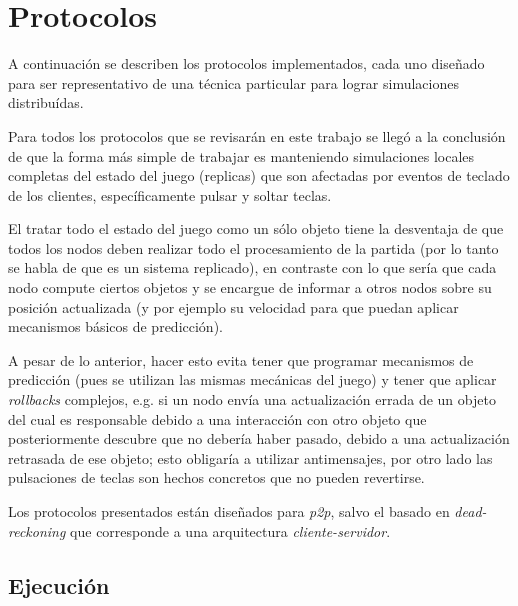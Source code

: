 \section{Protocolos}



A continuación se describen los protocolos implementados, cada uno diseñado para ser representativo de una técnica particular para lograr simulaciones distribuídas.

Para todos los protocolos que se revisarán en este trabajo se llegó a la conclusión de que la forma más simple de trabajar es manteniendo simulaciones locales completas del estado del juego (replicas) que son afectadas por eventos de teclado de los clientes, específicamente pulsar y soltar teclas.

El tratar todo el estado del juego como un sólo objeto tiene la desventaja de que todos los nodos deben realizar todo el procesamiento de la partida (por lo tanto se habla de que es un sistema replicado), en contraste con lo que sería que cada nodo compute ciertos objetos y se encargue de informar a otros nodos sobre su posición actualizada (y por ejemplo su velocidad para que puedan aplicar mecanismos básicos de predicción).


A pesar de lo anterior, hacer esto evita tener que programar mecanismos de predicción (pues se utilizan las mismas mecánicas del juego) y tener que aplicar \emph{rollbacks} complejos, e.g. si un nodo envía una actualización errada de un objeto del cual es responsable debido a una interacción con otro objeto que posteriormente descubre que no debería haber pasado, debido a una actualización retrasada de ese objeto; esto obligaría a utilizar antimensajes, por otro lado las pulsaciones de teclas son hechos concretos que no pueden revertirse.

Los protocolos presentados están diseñados para \emph{p2p}, salvo el basado en \emph{dead-reckoning} que corresponde a una arquitectura \emph{cliente-servidor}.

\subsection{Ejecución}

